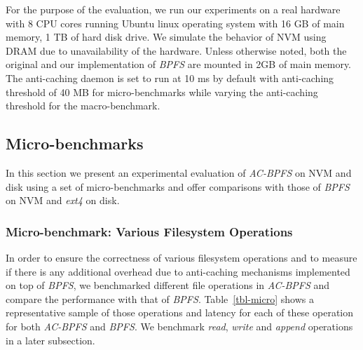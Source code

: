 For the purpose of the evaluation, we run our experiments on a real hardware with 8 CPU cores running Ubuntu linux operating system with 16 GB of main memory, 1 TB of hard disk drive. We simulate the behavior of NVM using DRAM due to unavailability of the hardware. Unless otherwise noted, both the original and our implementation of \textit{BPFS} are mounted in 2GB of main memory. The anti-caching daemon is set to run at 10 ms by default with anti-caching threshold of 40 MB for micro-benchmarks while varying the anti-caching threshold for the macro-benchmark.

\subsection{Micro-benchmarks}
In this section we present an experimental evaluation of \textit{AC-BPFS} on NVM and disk using a set of micro-benchmarks and offer comparisons with those of \textit{BPFS} on NVM and \textit{ext4} on disk. 

\subsubsection{Micro-benchmark: Various Filesystem Operations}
In order to ensure the correctness of various filesystem operations and to measure if there is any additional overhead due to anti-caching mechanisms implemented on top of \textit{BPFS}, we benchmarked different file operations in \textit{AC-BPFS} and compare the performance with that of \textit{BPFS}. Table~\ref{tbl-micro} shows a representative sample of those operations and latency for each of these operation for both \textit{AC-BPFS} and \textit{BPFS}. We benchmark \textit{read}, \textit{write} and \textit{append} operations in a later subsection. 

